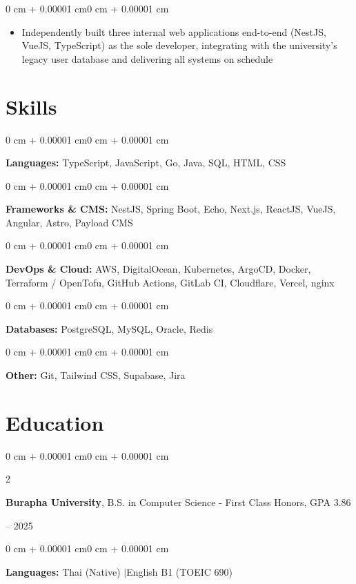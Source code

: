 \documentclass[10pt, letterpaper]{article}
\newenvironment{highlights}{
    \begin{itemize}[
        topsep=0.055 cm,
        parsep=0.055 cm,
        partopsep=0pt,
        itemsep=0pt,
        leftmargin=0.4 cm + 10pt
    ]
}{
    \end{itemize}
}
\newenvironment{onecolentry}{
    \begin{adjustwidth}{0 cm + 0.00001 cm}{0 cm + 0.00001 cm}
}{
    \end{adjustwidth}
}
\newenvironment{twocolentry}[2][]{
    \onecolentry
    \def\secondColumn{#2}
    \setcolumnwidth{\fill, 4.5 cm}
    \begin{paracol}{2}
}{
    \switchcolumn \raggedleft \secondColumn
    \end{paracol}
    \endonecolentry
}
\begin{document}
        \vspace{0.08 cm}
        \begin{onecolentry}
            \begin{highlights}
                \item Independently built three internal web applications end-to-end (NestJS, VueJS, TypeScript) as the sole developer, integrating with the university's legacy user database and delivering all systems on schedule
            \end{highlights}
        \end{onecolentry}


    \section{Skills}
        \begin{onecolentry}
            \textbf{Languages:} TypeScript, JavaScript, Go, Java, SQL, HTML, CSS
        \end{onecolentry}

        \vspace{0.08 cm}

        \begin{onecolentry}
            \textbf{Frameworks \& CMS:} NestJS, Spring Boot, Echo, Next.js, ReactJS, VueJS, Angular, Astro, Payload CMS
        \end{onecolentry}

        \vspace{0.08 cm}

        \begin{onecolentry}
            \textbf{DevOps \& Cloud:} AWS, DigitalOcean, Kubernetes, ArgoCD, Docker, Terraform / OpenTofu, GitHub Actions, GitLab CI, Cloudflare, Vercel, nginx
        \end{onecolentry}

        \vspace{0.08 cm}

        \begin{onecolentry}
            \textbf{Databases:} PostgreSQL, MySQL, Oracle, Redis
        \end{onecolentry}

        \vspace{0.08 cm}

        \begin{onecolentry}
            \textbf{Other:} Git, Tailwind CSS, Supabase, Jira
        \end{onecolentry}


    \section{Education}
        \begin{twocolentry}{
            2021 -- 2025
        }
            \textbf{Burapha University}, B.S. in Computer Science - First Class Honors, GPA 3.86
        \end{twocolentry}

        \vspace{0.15 cm}
        \begin{onecolentry}
            \textbf{Languages:} Thai (Native) \quad$|$\quad English B1 (TOEIC 690)
        \end{onecolentry}
\end{document}
